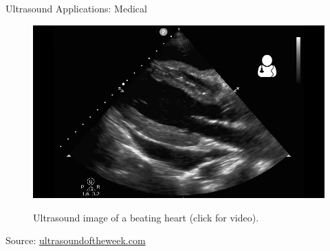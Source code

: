\begin{frame}{Ultrasound Applications: Medical \cont}
    \begin{figure}
        \centering
        \href{https://upload.wikimedia.org/wikipedia/commons/transcoded/5/56/Uotw78.webm/Uotw78.webm.360p.vp9.webm}{\includegraphics[height=0.8\textheight]{images/uotw78.jpg}}\\
        \caption{Ultrasound image of a beating heart (click for video).}
    \end{figure}
    \begin{flushright}
        \tiny
        Source: \url{ultrasoundoftheweek.com}
    \end{flushright}
\end{frame}






